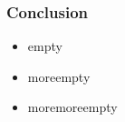 \begin{frame}
	\frametitle{Conclusion}
	\begin{minipage}[c][4cm]{\textwidth}
		\begin{itemize}
			\itemfill
			\item empty
			\item moreempty
			\item moremoreempty
		\end{itemize}
	\end{minipage}
\end{frame}
